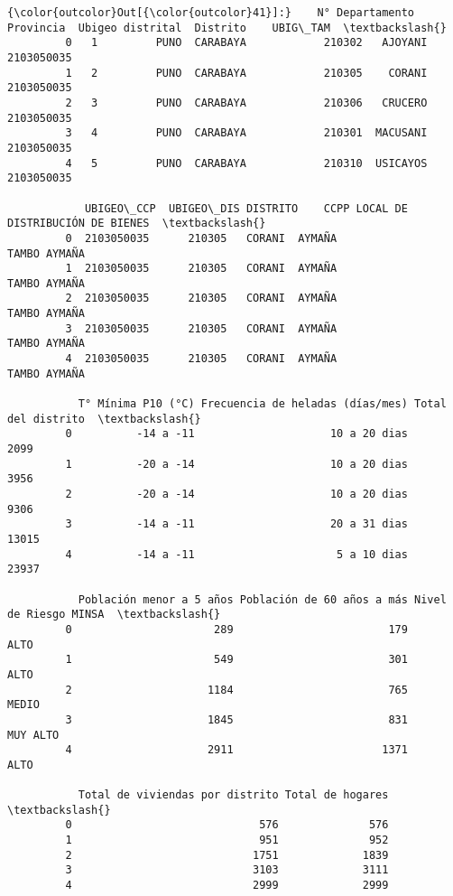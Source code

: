 \documentclass[11pt]{article}
\begin{document}
\begin{Verbatim}[commandchars=\\\{\}]
{\color{outcolor}Out[{\color{outcolor}41}]:}    N° Departamento Provincia  Ubigeo distrital  Distrito    UBIG\_TAM  \textbackslash{}
         0   1         PUNO  CARABAYA            210302   AJOYANI  2103050035   
         1   2         PUNO  CARABAYA            210305    CORANI  2103050035   
         2   3         PUNO  CARABAYA            210306   CRUCERO  2103050035   
         3   4         PUNO  CARABAYA            210301  MACUSANI  2103050035   
         4   5         PUNO  CARABAYA            210310  USICAYOS  2103050035   
         
            UBIGEO\_CCP  UBIGEO\_DIS DISTRITO    CCPP LOCAL DE DISTRIBUCIÓN DE BIENES  \textbackslash{}
         0  2103050035      210305   CORANI  AYMAÑA                    TAMBO AYMAÑA   
         1  2103050035      210305   CORANI  AYMAÑA                    TAMBO AYMAÑA   
         2  2103050035      210305   CORANI  AYMAÑA                    TAMBO AYMAÑA   
         3  2103050035      210305   CORANI  AYMAÑA                    TAMBO AYMAÑA   
         4  2103050035      210305   CORANI  AYMAÑA                    TAMBO AYMAÑA   
         
           T° Mínima P10 (°C) Frecuencia de heladas (días/mes) Total del distrito  \textbackslash{}
         0          -14 a -11                     10 a 20 dias               2099   
         1          -20 a -14                     10 a 20 dias               3956   
         2          -20 a -14                     10 a 20 dias               9306   
         3          -14 a -11                     20 a 31 dias              13015   
         4          -14 a -11                      5 a 10 dias              23937   
         
           Población menor a 5 años Población de 60 años a más Nivel de Riesgo MINSA  \textbackslash{}
         0                      289                        179                  ALTO   
         1                      549                        301                  ALTO   
         2                     1184                        765                 MEDIO   
         3                     1845                        831              MUY ALTO   
         4                     2911                       1371                  ALTO   
         
           Total de viviendas por distrito Total de hogares  \textbackslash{}
         0                             576              576   
         1                             951              952   
         2                            1751             1839   
         3                            3103             3111   
         4                            2999             2999   
         

\end{Verbatim}
\end{document}
